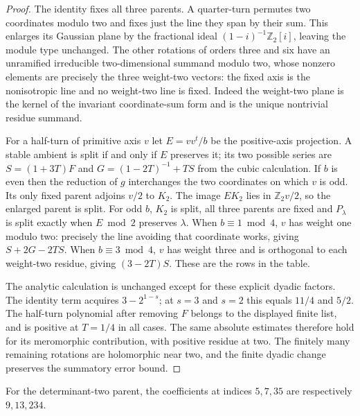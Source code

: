 \begin{proof}
The identity fixes all three parents. A quarter-turn permutes two
coordinates modulo two and fixes just the line they span by their sum.
This enlarges its Gaussian plane by the fractional ideal
$(1-i)^{-1}\mathbb Z_2[i]$, leaving the module type unchanged.
The other rotations of orders three and six have an unramified
irreducible two-dimensional summand modulo two, whose nonzero elements
are precisely the three weight-two vectors: the fixed axis is the
nonisotropic line and no weight-two line is fixed. Indeed the weight-two
plane is the kernel of the invariant coordinate-sum form and is the
unique nontrivial residue summand.

For a half-turn of primitive axis $v$ let $E=vv^t/b$ be the positive-axis
projection. A stable ambient is split if and only if $E$ preserves it;
its two possible series are $S=(1+3T)F$ and $G=(1-2T)^{-1}+TS$
from the cubic calculation. If $b$ is even then the reduction of $g$
interchanges the two coordinates on which $v$ is odd. Its only fixed
parent adjoins $v/2$ to $K_2$. The image $E K_2$ lies in
$\mathbb Z_2v/2$, so the enlarged parent is split. For odd $b$,
$K_2$ is split, all three parents are fixed and $P_\lambda$ is split
exactly when $E\bmod2$ preserves $\lambda$. When $b\equiv1\bmod4$,
$v$ has weight one modulo two: precisely the line avoiding that
coordinate works, giving $S+2G-2TS$. When $b\equiv3\bmod4$, $v$
has weight three and is orthogonal to each weight-two residue, giving
$(3-2T)S$. These are the rows in the table.

The analytic calculation is unchanged except for these explicit
dyadic factors. The identity term acquires $3-2^{1-s}$; at $s=3$
and $s=2$ this equals $11/4$ and $5/2$. The half-turn polynomial
after removing $F$ belongs to the displayed finite list, and is
positive at $T=1/4$ in all cases. The same absolute estimates therefore
hold for its meromorphic contribution, with positive residue at two.
The finitely many remaining rotations are holomorphic near two, and
the finite dyadic change preserves the summatory error bound.
\end{proof}
For the determinant-two parent, the coefficients at indices
$5,7,35$ are respectively $9,13,234$.
